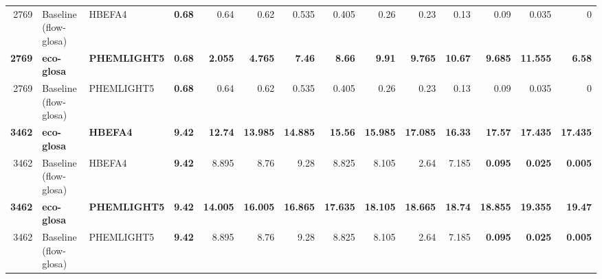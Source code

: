 \begin{table}[htb]
{\begin{tabular}{r l l r *{10}{r}}
    2769 & Baseline (\ac{flow-glosa}) & HBEFA4 & \textbf{0.68} & 0.64 & 0.62 & 0.535 & 0.405 & 0.26 & 0.23 & 0.13 & 0.09 & 0.035 & 0\\
    \textbf{2769} & \textbf{\ac{eco-glosa}} & \textbf{PHEMLIGHT5} & \textbf{0.68} & \textbf{2.055} & \textbf{4.765} & \textbf{7.46} & \textbf{8.66} & \textbf{9.91} & \textbf{9.765} & \textbf{10.67} & \textbf{9.685} & \textbf{11.555} & \textbf{6.58}\\
    2769 & Baseline (\ac{flow-glosa}) & PHEMLIGHT5 & \textbf{0.68} & 0.64 & 0.62 & 0.535 & 0.405 & 0.26 & 0.23 & 0.13 & 0.09 & 0.035 & 0\\
    \midrule
    \textbf{3462} & \textbf{\ac{eco-glosa}} & \textbf{HBEFA4} & \textbf{9.42} & \textbf{12.74} & \textbf{13.985} & \textbf{14.885} & \textbf{15.56} & \textbf{15.985} & \textbf{17.085} & \textbf{16.33} & \textbf{17.57} & \textbf{17.435} & \textbf{17.435}\\
    3462 & Baseline (\ac{flow-glosa}) & HBEFA4 & \textbf{9.42} & 8.895 & 8.76 & 9.28 & 8.825 & 8.105 & 2.64 & 7.185 & \textbf{0.095} & \textbf{0.025} & \textbf{0.005}\\
    \textbf{3462} & \textbf{\ac{eco-glosa}} & \textbf{PHEMLIGHT5} & \textbf{9.42} & \textbf{14.005} & \textbf{16.005} & \textbf{16.865} & \textbf{17.635} & \textbf{18.105} & \textbf{18.665} & \textbf{18.74} & \textbf{18.855} & \textbf{19.355} & \textbf{19.47}\\
    3462 & Baseline (\ac{flow-glosa}) & PHEMLIGHT5 & \textbf{9.42} & 8.895 & 8.76 & 9.28 & 8.825 & 8.105 & 2.64 & 7.185 & \textbf{0.095} & \textbf{0.025} & \textbf{0.005}\\
    \bottomrule
  \end{tabular}}
\end{table}